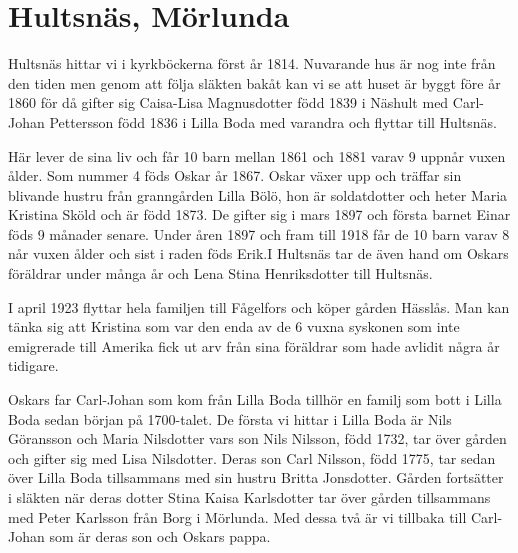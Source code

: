 \chapter{Hultsnäs, Mörlunda}
Hultsnäs hittar vi i kyrkböckerna först år 1814.
Nuvarande hus är nog inte från den tiden men genom att följa släkten bakåt kan vi se att huset är byggt före år 1860 för då gifter sig Caisa-Lisa Magnusdotter född 1839 i Näshult med Carl-Johan Pettersson född 1836 i Lilla Boda med varandra och flyttar till Hultsnäs.

Här lever de sina liv och får 10 barn mellan 1861 och 1881 varav 9 uppnår vuxen ålder. 
Som nummer 4 föds Oskar år 1867.
Oskar växer upp och träffar sin blivande hustru från granngården Lilla Bölö, hon är soldatdotter och heter Maria Kristina Sköld och är född 1873.
De gifter sig i mars 1897 och första barnet Einar föds 9 månader senare. 
Under åren 1897 och fram till 1918 får de 10 barn varav 8 når vuxen ålder och sist i raden föds Erik.I Hultsnäs tar de även hand om Oskars föräldrar under många år och Lena Stina Henriksdotter till Hultsnäs.

I april 1923 flyttar hela familjen till Fågelfors och köper gården Hässlås. 
Man kan tänka sig att Kristina som var den enda av de 6 vuxna syskonen som inte emigrerade till Amerika fick ut arv från sina föräldrar som hade avlidit några år tidigare.

Oskars far Carl-Johan som kom från Lilla Boda tillhör en familj som bott i Lilla Boda sedan början på 1700-talet. 
De första vi hittar i Lilla Boda är Nils Göransson och Maria Nilsdotter vars son Nils Nilsson, född 1732, tar över gården och gifter sig med Lisa Nilsdotter. 
Deras son Carl Nilsson, född 1775, tar sedan över Lilla Boda tillsammans med sin hustru Britta Jonsdotter. 
Gården fortsätter i släkten när deras dotter Stina Kaisa Karlsdotter tar över gården tillsammans med Peter Karlsson från Borg i Mörlunda. 
Med dessa två är vi tillbaka till Carl-Johan som är deras son och Oskars pappa.